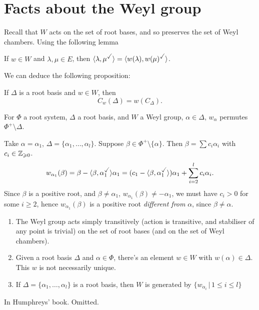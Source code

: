 \documentclass{article}
\begin{document}
\section{Facts about the Weyl group}
Recall that $W$ acts on the set of root bases, and so preserves the set of Weyl chambers. Using the following lemma \begin{fancylem}{}
    If $w \in W$ and $\lambda, \mu \in E$, then $\langle \lambda, \mu^{\checked} \rangle = \langle w(\lambda), w(\mu)^{\checked} \rangle$.
\end{fancylem}
We can deduce the following proposition:
\begin{fancyprop}{}
    If $\Delta$ is a root basis and $w \in W$, then \[ C_w(\Delta) = w(C_\Delta).\]
\end{fancyprop}
\begin{fancylem}{}
    For $\Phi$ a root system, $\Delta$ a root basis, and $W$ a Weyl group, $\alpha \in \Delta$, $w_{\alpha}$ permutes $\Phi^{+} \setminus \Delta$.
\end{fancylem}
\proof Take $\alpha = \alpha_{1}$, $\Delta = \{ \alpha_{1}, \dots, \alpha_{l}\}$. Suppose $\beta \in \Phi^{+} \setminus \{ \alpha \}$. Then $\beta = \sum c_{i} \alpha_{i}$ with $c_{i} \in \mathbb{Z}_{\geqslant 0}$. \[ w_{\alpha_1}(\beta) = \beta - \langle \beta, \alpha_{1}^{\checked} \rangle \alpha_{1} = (c_{1}-\langle \beta, \alpha_{1}^{\checked} \rangle)\alpha_{1} + \sum_{i=2}^{l} c_{i}\alpha_{i}.\] Since $\beta$ is a positive root, and $\beta \neq \alpha_{1}$, $w_{\alpha_{1}}(\beta) \neq -\alpha_{1}$, we must have $c_{i} > 0$ for some $i \geq 2$, hence $w_{\alpha_{1}}(\beta)$ is a positive root \textit{different from} $\alpha$, since $\beta \neq \alpha$. \endproof
\begin{fancythm}{}
    \begin{enumerate}
        \item The Weyl group acts simply transitively (action is transitive, and stabiliser of any point is trivial) on the set of root bases (and on the set of Weyl chambers).
        \item Given a root basis $\Delta$ and $\alpha \in \Phi$, there's an element $w \in W$ with $w(\alpha)\in \Delta$. This $w$ is not necessarily unique.
        \item If $\Delta = \{ \alpha_{1}, \dots, \alpha_{l}\}$ is a root basis, then $W$ is generated by $\{ w_{\alpha_{i}} \, | \, 1 \leq i \leq l \}$ 
    \end{enumerate}
\end{fancythm}
\proof In Humphreys' book. Omitted.
\end{document}

